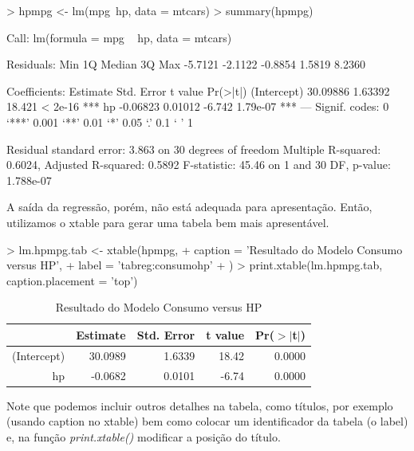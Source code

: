 \documentclass[12pt,a4paper,oneside]{erdc}
\begin{document}
	
\begin{Schunk}
\begin{Sinput}
> hpmpg <- lm(mpg~hp, data = mtcars)
> summary(hpmpg)
\end{Sinput}
\begin{Soutput}
Call:
lm(formula = mpg ~ hp, data = mtcars)

Residuals:
    Min      1Q  Median      3Q     Max 
-5.7121 -2.1122 -0.8854  1.5819  8.2360 

Coefficients:
            Estimate Std. Error t value Pr(>|t|)    
(Intercept) 30.09886    1.63392  18.421  < 2e-16 ***
hp          -0.06823    0.01012  -6.742 1.79e-07 ***
---
Signif. codes:  0 ‘***’ 0.001 ‘**’ 0.01 ‘*’ 0.05 ‘.’ 0.1 ‘ ’ 1

Residual standard error: 3.863 on 30 degrees of freedom
Multiple R-squared:  0.6024,	Adjusted R-squared:  0.5892 
F-statistic: 45.46 on 1 and 30 DF,  p-value: 1.788e-07
\end{Soutput}
\end{Schunk}


A saída da regressão, porém, não está adequada para apresentação. Então, utilizamos o xtable para gerar uma tabela bem mais apresentável.

\begin{Schunk}
\begin{Sinput}
> lm.hpmpg.tab <- xtable(hpmpg, 
+                        caption = 'Resultado do Modelo Consumo versus HP', 
+                        label  = 'tabreg:consumohp'
+                        )
> print.xtable(lm.hpmpg.tab, caption.placement = 'top')
\end{Sinput}
\begin{table}[ht]
\centering
\caption{Resultado do Modelo Consumo versus HP} 
\label{tabreg:consumohp}
\begin{tabular}{rrrrr}
  \hline
 & Estimate & Std. Error & t value & Pr($>$$|$t$|$) \\ 
  \hline
(Intercept) & 30.0989 & 1.6339 & 18.42 & 0.0000 \\ 
  hp & -0.0682 & 0.0101 & -6.74 & 0.0000 \\ 
   \hline
\end{tabular}
\end{table}\end{Schunk}


Note que podemos incluir outros detalhes na tabela, como títulos, por exemplo (usando caption no xtable) bem como colocar um identificador da tabela (o label) e, na função \textit{print.xtable()} modificar a posição do título. 
\end{document}
